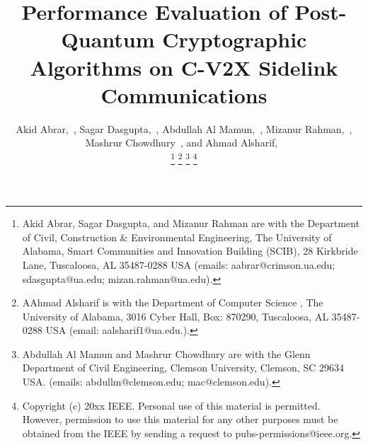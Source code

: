 \documentclass[letterpaper,journal]{IEEEtran}
\begin{document}
\title{Performance Evaluation of Post-Quantum Cryptographic Algorithms on C-V2X Sidelink Communications}

\author{%
Akid Abrar,~,
Sagar Dasgupta,~,
Abdullah Al Mamun,~,
Mizanur Rahman,~,
Mashrur Chowdhury~,
and Ahmad Alsharif,~

\thanks{Akid Abrar, Sagar Dasgupta, and Mizanur Rahman are with the Department of Civil, Construction \& Environmental Engineering, The University of Alabama, Smart Communities and Innovation Building (SCIB), 28 Kirkbride Lane, Tuscaloosa, AL 35487-0288 USA (emails: aabrar@crimson.ua.edu; sdasgupta@ua.edu; mizan.rahman@ua.edu).}
\thanks{AAhmad Alsharif is with the Department of Computer Science
, The University of Alabama, 3016 Cyber Hall, Box: 870290, Tuscaloosa, AL 35487-0288 USA (email: aalsharif1@ua.edu.).}%
\thanks{Abdullah Al Mamun and Mashrur Chowdhury are with the Glenn Department of Civil Engineering, Clemson University, Clemson, SC 29634 USA. (emails: abdullm@clemson.edu; mac@clemson.edu).}%
\thanks{Copyright (c) 20xx IEEE. Personal use of this material is permitted. However, permission to use this material for any other purposes must be obtained from the IEEE by sending a request to pubs-permissions@ieee.org.}
}




\maketitle
\end{document}
